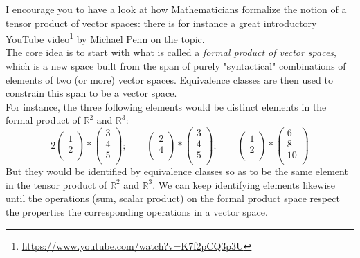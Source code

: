 \documentclass[solutions.tex]{subfiles}
\begin{document}
\begin{remark} I encourage you to have a look at how Mathematicians
formalize the notion of a tensor product of vector spaces: there is
for instance a great introductory YouTube
video\footnote{\url{https://www.youtube.com/watch?v=K7f2pCQ3p3U}}
by Michael Penn on the topic. \\

The core idea is to start with what is called a \textit{formal product
of vector spaces}, which is a new space built from the span of purely
"syntactical" combinations of elements of two (or more) vector spaces.
Equivalence classes are then used to constrain this span to be a vector
space. \\

For instance, the three following elements would be distinct elements in
the formal product of $\mathbb{R}^2$ and $\mathbb{R}^3$:
\[
	2\begin{pmatrix} 1 \\ 2 \\ \end{pmatrix}*
		\begin{pmatrix} 3 \\ 4 \\ 5\\ \end{pmatrix};\qquad
	\begin{pmatrix} 2 \\ 4 \\ \end{pmatrix}*
		\begin{pmatrix} 3 \\ 4 \\ 5\\ \end{pmatrix};\qquad
	\begin{pmatrix} 1 \\ 2 \\ \end{pmatrix}*
		\begin{pmatrix} 6 \\ 8 \\ 10\\ \end{pmatrix}
\]
But they would be identified by equivalence classes so as to
be the same element in the tensor product of $\mathbb{R}^2$ and
$\mathbb{R}^3$. We can keep identifying elements likewise until
the operations (sum, scalar product) on the formal product space
respect the properties the corresponding operations in a vector space.
\end{remark}
\end{document}
